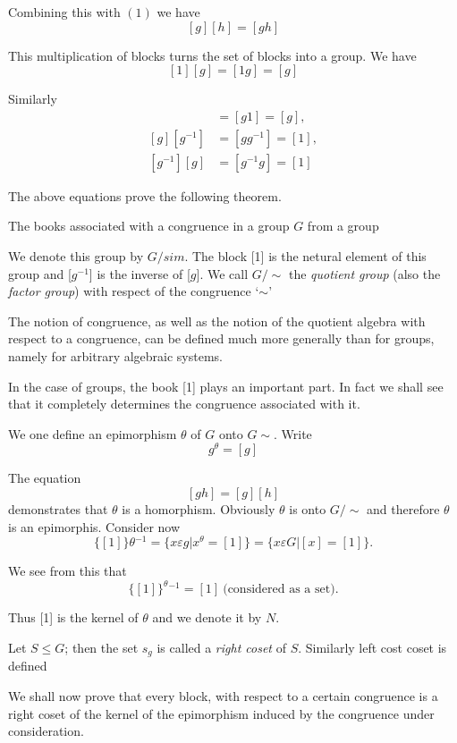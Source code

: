 Combining this with $(1)$ we have
$$
[g] [h] = [gh]
$$

This multiplication of blocks turns the set of blocks into a group. We
have 
$$
[1] [g] = [1g] =[g]
$$

Similarly
\begin{align*}
  [g] [1] & = [g1]  = [g],\\
  [g][g^{-1}] & = [gg^{-1}]  = [1],\\
  [g^{-1}] [g] & = [g^{-1} g] =[1]
\end{align*}

The above equations prove the following theorem.
\begin{Theorem} %
  The books associated with a congruence in a group $G$ from a group
\end{Theorem}

We denote this group by $G/sim$. The block [1] is the netural element
of this group and [$g^{-1}$] is the inverse of [$g$]. We call $G/
\sim$ the \textit{quotient group} (also the \textit{ factor group})
with respect of the congruence `$\sim$' 

The notion of congruence, as well as the notion of the quotient
algebra with respect to a congruence, can be defined much more
generally than for groups, namely for arbitrary algebraic systems.   

In the case of groups, the book [1] plays an important part. In fact
we shall see that it completely determines the congruence associated
with it. 

We one define an epimorphism $\theta$ of $G$ onto $G \sim$. Write
$$
g^\theta = [g]
$$

The equation
$$
[gh] = [g] [h]
$$
demonstrates that $\theta$ is a homorphism. Obviously $\theta$ is onto
$G / \sim$ and therefore $\theta$ is an epimorphis. 
 Consider now
$$
\{[1]\}\theta{^{-1}} = \bigg\{ x \varepsilon g \bigg| x^\theta =
  [1]\big\} = \bigg\{ x \varepsilon G \bigg| [x] = [1]\bigg\}. 
$$

We see from this that
$$
\{ [1]\}^\theta{^{-1}} = [1] ~\text{(considered as a set)}.
$$

Thus [1] is the kernel of $\theta$ and we denote it by $N$.
\begin{definition}
  Let $S \le G$; then the set $s_g$ is called a {\em right coset} of
  $S$. Similarly left cost coset is defined 
\end{definition}

We shall now prove that every block, with respect to a certain
congruence is a right coset of the kernel of the epimorphism induced
by the congruence under consideration. 

